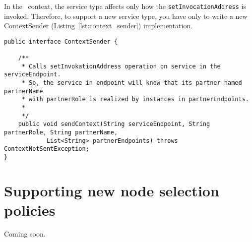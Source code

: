 In the \ee\ context, the service type affects only how the \texttt{setInvocationAddress} is invoked.
Therefore, to support a new service type, you have only to write a new \textsf{ContextSender} (Listing~\ref{lst:context_sender}) implementation.

{\footnotesize
\begin{lstlisting}[caption=\textsf{ContextSender} interface, label=lst:context_sender]
public interface ContextSender {

    /**
     * Calls setInvokationAddress operation on service in the serviceEndpoint.
     * So, the service in endpoint will know that its partner named partnerName
     * with partnerRole is realized by instances in partnerEndpoints.
     * 
     */
    public void sendContext(String serviceEndpoint, String partnerRole, String partnerName,
            List<String> partnerEndpoints) throws ContextNotSentException;
}
\end{lstlisting}
}


\section{Supporting new node selection policies}

Coming soon.
